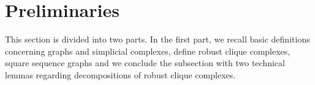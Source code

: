 \documentclass[a4paper, v2021]{lipics-v2021}
\theoremstyle{plain}
\theoremstyle{definition}
\newcommand{\Cliq}[2]{\mathsf{Cliq}_{#1}(#2)}
\DeclarePairedDelimiter{\gr}{\lVert}{\rVert}
\begin{document}







\section{Preliminaries}\label{s:Preliminaries}
This section is divided into two parts. In the first part, we recall basic definitions concerning graphs and simplicial complexes, define robust clique complexes, square sequence graphs and we conclude the subsection with two technical lemmas regarding decompositions of robust clique complexes.
\end{document}
